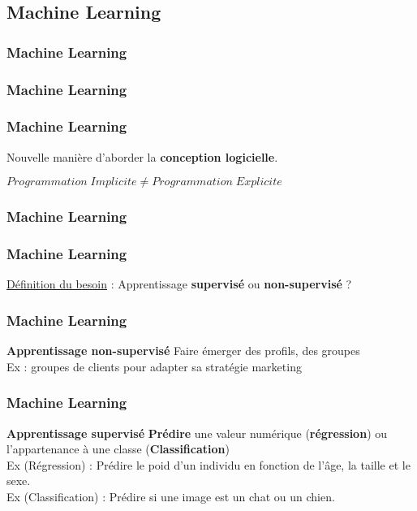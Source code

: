 \subsection{Machine Learning}

\begin{frame}
  \frametitle{Machine Learning}
\end{frame}

\begin{frame}
  \frametitle{Machine Learning}
\end{frame}

\begin{frame}
  \frametitle{Machine Learning}
  \begin{center}
  Nouvelle manière d'aborder la \textbf{conception logicielle}.
  \end{center}
  \begin{center}
  $\boxed{Programmation\;Implicite \neq Programmation\;Explicite}$
  \end{center}
\end{frame}

\begin{frame}
  \frametitle{Machine Learning}
\end{frame}

\begin{frame}
  \frametitle{Machine Learning}
  \underline{Définition du besoin} :
  \newline
  \newline
  Apprentissage \textbf{supervisé} ou \textbf{non-supervisé} ?
\end{frame}

\begin{frame}
  \frametitle{Machine Learning}
  \textbf{Apprentissage non-supervisé}
  \newline \newline
  Faire émerger des profils, des groupes \\
  \newline
  Ex : groupes de clients pour adapter sa stratégie marketing \\
\end{frame}

\begin{frame}
  \frametitle{Machine Learning}
  \textbf{Apprentissage supervisé}
  \newline \newline
  \textbf{Prédire} une valeur numérique (\textbf{régression}) ou l'appartenance à une classe (\textbf{Classification}) \\
  \newline
  Ex (Régression)     : Prédire le poid d'un individu en fonction de l'âge, la taille et le sexe. \\
  Ex (Classification) : Prédire si une image est un chat ou un chien. \\
\end{frame}

